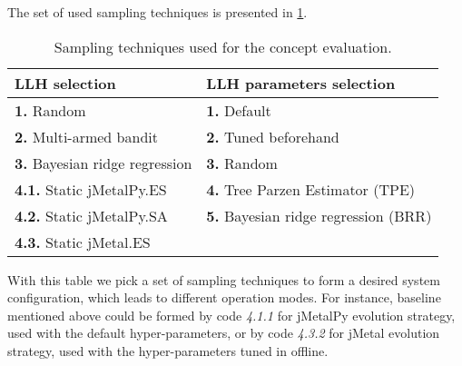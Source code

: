 The set of used sampling techniques is presented in \cref{eval: concept settings table}.
\begin{table}[h!]
	\centering
	\begin{tabular}{ll}
		\hline
		\rowcolor{gray!10}
		\textbf{LLH selection} & \textbf{LLH parameters selection} \\
		\hline
		\textbf{1.} Random & \textbf{1.} Default \\
		\textbf{2.} Multi-armed bandit & \textbf{2.} Tuned beforehand \\
		\textbf{3.} Bayesian ridge regression & \textbf{3.} Random \\
		\textbf{4.1.} Static jMetalPy.ES & \textbf{4.} Tree Parzen Estimator (TPE) \\
		\textbf{4.2.} Static jMetalPy.SA & \textbf{5.} Bayesian ridge regression (BRR) \\
		\textbf{4.3.} Static jMetal.ES & \\
		\hline
	\end{tabular}
	
	\caption{Sampling techniques used for the concept evaluation.}
	\label{eval: concept settings table}
\end{table}


With this table we pick a set of sampling techniques to form a desired system configuration, which leads to different operation modes. For instance, baseline mentioned above could be formed by code \emph{4.1.1} for jMetalPy evolution strategy, used with the default hyper-parameters, or by code \emph{4.3.2} for jMetal evolution strategy, used with the hyper-parameters tuned in offline.

